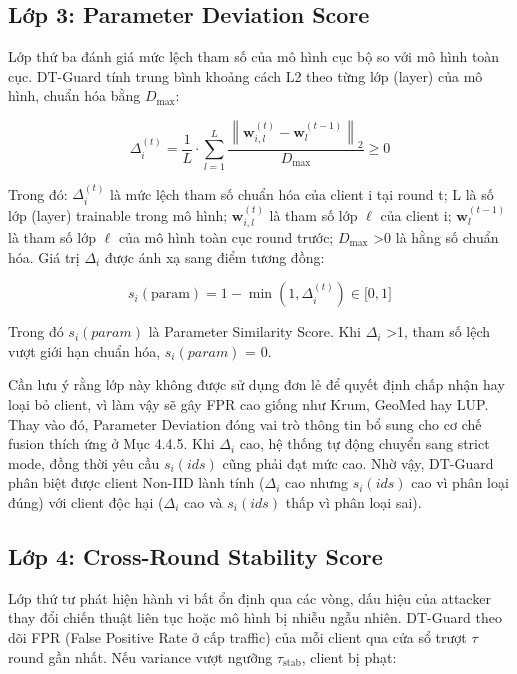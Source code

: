 \subsection{Lớp 3: Parameter Deviation Score}
Lớp thứ ba đánh giá mức lệch tham số của mô hình cục bộ so với mô hình toàn cục. DT-Guard tính trung bình khoảng cách L2 theo từng lớp (layer) của mô hình, chuẩn hóa bằng $D_{\max}$:

\begin{equation}
\Delta_{i}^{(t)} = \frac{1}{L} \cdot \sum_{l = 1}^{L}\frac{\left\| \mathbf{w}_{i,l}^{(t)} - \mathbf{w}_{l}^{\left( t-1 \right)} \right\|_{2}}{D_{\max}} \geq 0
\tag{4.3}
\end{equation}

Trong đó: $\Delta_{i}^{(t)}$ là mức lệch tham số chuẩn hóa của client i tại round t; L là số lớp (layer) trainable trong mô hình; $\mathbf{w}_{i,l}^{(t)}$ là tham số lớp $\ell$ của client i; $\mathbf{w}_{l}^{(t-1)}$ là tham số lớp $\ell$ của mô hình toàn cục round trước; $D_{\max}$ \textgreater 0 là hằng số chuẩn hóa. Giá trị $\Delta_{i}$ được ánh xạ sang điểm tương đồng:

\begin{equation}
s_{i}(\text{param}) = 1 - \min(1,\Delta_{i}^{(t)}) \in \lbrack 0,1\rbrack
\tag{4.4}
\end{equation}

Trong đó $s_{i}(param)$ là Parameter Similarity Score. Khi $\Delta_{i}$ \textgreater 1, tham số lệch vượt giới hạn chuẩn hóa, $s_{i}(param)$ = 0.

Cần lưu ý rằng lớp này không được sử dụng đơn lẻ để quyết định chấp nhận hay loại bỏ client, vì làm vậy sẽ gây FPR cao giống như Krum, GeoMed hay LUP. Thay vào đó, Parameter Deviation đóng vai trò thông tin bổ sung cho cơ chế fusion thích ứng ở Mục 4.4.5. Khi $\Delta_{i}$ cao, hệ thống tự động chuyển sang strict mode, đồng thời yêu cầu $s_{i}(ids)$ cũng phải đạt mức cao. Nhờ vậy, DT-Guard phân biệt được client Non-IID lành tính ($\Delta_{i}$ cao nhưng $s_{i}(ids)$ cao vì phân loại đúng) với client độc hại ($\Delta_{i}$ cao và $s_{i}(ids)$ thấp vì phân loại sai).

\subsection{Lớp 4: Cross-Round Stability Score}
Lớp thứ tư phát hiện hành vi bất ổn định qua các vòng, dấu hiệu của attacker thay đổi chiến thuật liên tục hoặc mô hình bị nhiễu ngẫu nhiên. DT-Guard theo dõi FPR (False Positive Rate ở cấp traffic) của mỗi client qua cửa sổ trượt $\tau$ round gần nhất. Nếu variance vượt ngưỡng $\tau_{\text{stab}}$, client bị phạt:

